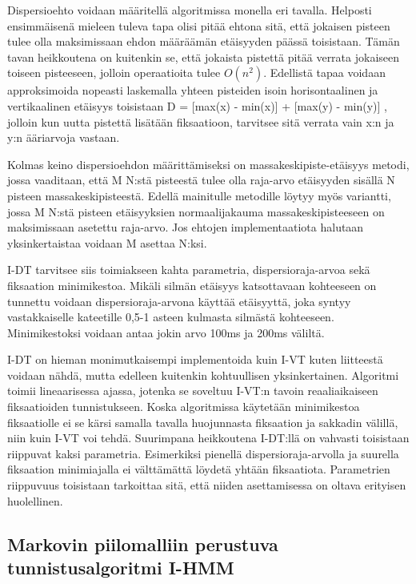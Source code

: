 Dispersioehto voidaan määritellä algoritmissa monella eri tavalla. Helposti ensimmäisenä mieleen tuleva tapa olisi pitää ehtona sitä, että jokaisen pisteen tulee olla maksimissaan ehdon määräämän etäisyyden päässä toisistaan. Tämän tavan heikkoutena on kuitenkin se, että jokaista pistettä pitää verrata jokaiseen toiseen pisteeseen, jolloin operaatioita tulee \(O(n^2)\). \citep[s.111] {shic2008} Edellistä tapaa voidaan approksimoida nopeasti laskemalla yhteen pisteiden isoin horisontaalinen ja vertikaalinen etäisyys toisistaan D = [max(x) - min(x)] + [max(y) - min(y)] \citep[s. 74]{salvucci2000}, jolloin kun uutta pistettä lisätään fiksaatioon, tarvitsee sitä verrata vain x:n ja y:n ääriarvoja vastaan.

Kolmas keino dispersioehdon määrittämiseksi on massakeskipiste-etäisyys metodi, jossa vaaditaan, että M N:stä pisteestä tulee olla raja-arvo etäisyyden sisällä N pisteen massakeskipisteestä. Edellä mainitulle metodille löytyy myös variantti, jossa M N:stä pisteen etäisyyksien normaalijakauma massakeskipisteeseen on maksimissaan asetettu raja-arvo. Jos ehtojen implementaatiota halutaan yksinkertaistaa voidaan M asettaa N:ksi. \citep[s.111] {shic2008}

I-DT tarvitsee siis toimiakseen kahta parametria, dispersioraja-arvoa sekä fiksaation minimikestoa. Mikäli silmän etäisyys katsottavaan kohteeseen on tunnettu voidaan dispersioraja-arvona käyttää etäisyyttä, joka syntyy vastakkaiselle kateetille 0,5-1 asteen kulmasta silmästä kohteeseen. Minimikestoksi voidaan antaa jokin arvo 100ms ja 200ms väliltä. \citep[s. 74]{salvucci2000}

I-DT on hieman monimutkaisempi implementoida kuin I-VT kuten liitteestä \emph{} voidaan nähdä, mutta edelleen kuitenkin kohtuullisen yksinkertainen. Algoritmi toimii lineaarisessa ajassa, jotenka se soveltuu I-VT:n tavoin reaaliaikaiseen fiksaatioiden tunnistukseen. Koska algoritmissa käytetään minimikestoa fiksaatiolle ei se kärsi samalla tavalla huojunnasta fiksaation ja sakkadin välillä, niin kuin I-VT voi tehdä. Suurimpana heikkoutena I-DT:llä on vahvasti toisistaan riippuvat kaksi parametria. Esimerkiksi pienellä dispersioraja-arvolla ja suurella fiksaation minimiajalla ei välttämättä löydetä yhtään fiksaatiota. Parametrien riippuvuus toisistaan tarkoittaa sitä, että niiden asettamisessa on oltava erityisen huolellinen.


\subsection{Markovin piilomalliin perustuva tunnistusalgoritmi I-HMM}

